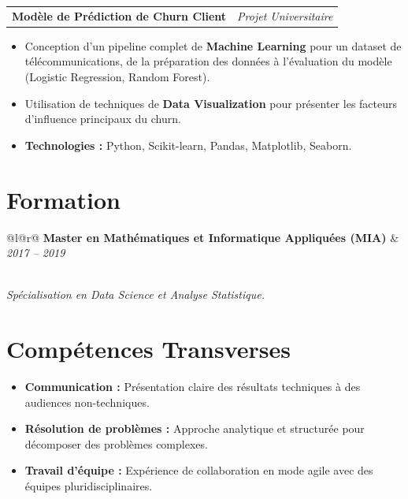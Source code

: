\documentclass[a4paper,10pt]{article}
\begin{document}
\begin{tabular*}{\textwidth}{@{}l@{\extracolsep{\fill}}r@{}}
\textbf{Modèle de Prédiction de Churn Client} & \textit{Projet Universitaire} \\
\end{tabular*}
\begin{itemize}[leftmargin=*, topsep=0.3em, itemsep=0.2em]
    \item Conception d'un pipeline complet de \textbf{Machine Learning} pour un dataset de télécommunications, de la préparation des données à l'évaluation du modèle (Logistic Regression, Random Forest).
    \item Utilisation de techniques de \textbf{Data Visualization} pour présenter les facteurs d'influence principaux du churn.
    \item \textbf{Technologies :} Python, Scikit-learn, Pandas, Matplotlib, Seaborn.
\end{itemize}

\section*{Formation}
\begin{tabular*}{\textwidth}{@{}l@{\extracolsep{\fill}}r@{}}
\textbf{Master en Mathématiques et Informatique Appliquées (MIA)} & \textit{2017 -- 2019} \\
 \\
\end{tabular*}
\textit{Spécialisation en Data Science et Analyse Statistique.}

\section*{Compétences Transverses}
\begin{itemize}[leftmargin=*, label={}, itemsep=0.2em, topsep=0.3em]
    \item \textbf{Communication :} Présentation claire des résultats techniques à des audiences non-techniques.
    \item \textbf{Résolution de problèmes :} Approche analytique et structurée pour décomposer des problèmes complexes.
    \item \textbf{Travail d'équipe :} Expérience de collaboration en mode agile avec des équipes pluridisciplinaires.
\end{itemize}
\end{document}
